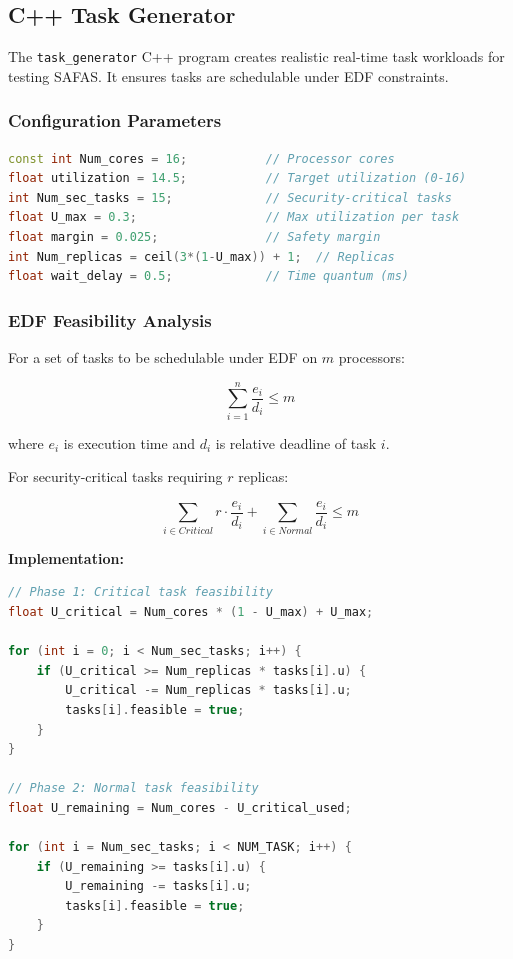 \documentclass[12pt,a4paper]{article}
\begin{document}
\subsection{C++ Task Generator}

The \texttt{task\_generator} C++ program creates realistic real-time task workloads for testing SAFAS. It ensures tasks are schedulable under EDF constraints.

\subsubsection{Configuration Parameters}

\begin{lstlisting}[language=C++, caption={Task Generator Configuration}]
const int Num_cores = 16;           // Processor cores
float utilization = 14.5;           // Target utilization (0-16)
int Num_sec_tasks = 15;             // Security-critical tasks
float U_max = 0.3;                  // Max utilization per task
float margin = 0.025;               // Safety margin
int Num_replicas = ceil(3*(1-U_max)) + 1;  // Replicas
float wait_delay = 0.5;             // Time quantum (ms)
\end{lstlisting}

\subsubsection{EDF Feasibility Analysis}

For a set of tasks to be schedulable under EDF on $m$ processors:

\begin{equation}
\sum_{i=1}^{n} \frac{e_i}{d_i} \leq m
\end{equation}

where $e_i$ is execution time and $d_i$ is relative deadline of task $i$.

For security-critical tasks requiring $r$ replicas:

\begin{equation}
\sum_{i \in Critical} r \cdot \frac{e_i}{d_i} + \sum_{i \in Normal} \frac{e_i}{d_i} \leq m
\end{equation}

\textbf{Implementation:}

\begin{lstlisting}[language=C++, caption={Feasibility Check Algorithm}]
// Phase 1: Critical task feasibility
float U_critical = Num_cores * (1 - U_max) + U_max;

for (int i = 0; i < Num_sec_tasks; i++) {
    if (U_critical >= Num_replicas * tasks[i].u) {
        U_critical -= Num_replicas * tasks[i].u;
        tasks[i].feasible = true;
    }
}

// Phase 2: Normal task feasibility
float U_remaining = Num_cores - U_critical_used;

for (int i = Num_sec_tasks; i < NUM_TASK; i++) {
    if (U_remaining >= tasks[i].u) {
        U_remaining -= tasks[i].u;
        tasks[i].feasible = true;
    }
}
\end{lstlisting}
\end{document}
